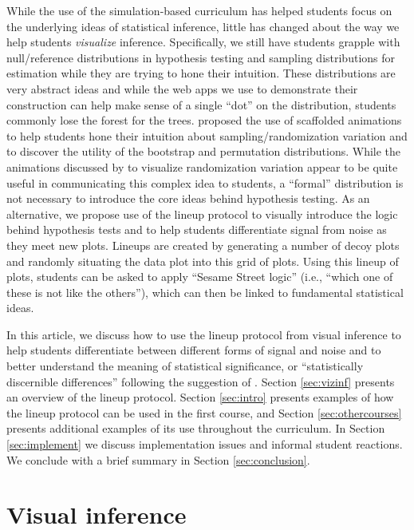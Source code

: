 \documentclass[12pt]{article}
\begin{document}
While the use of the simulation-based curriculum has helped students
focus on the underlying ideas of statistical inference, little has
changed about the way we help students \emph{visualize} inference.
Specifically, we still have students grapple with null/reference
distributions in hypothesis testing and sampling distributions for
estimation while they are trying to hone their intuition. These
distributions are very abstract ideas and while the web apps we use to
demonstrate their construction can help make sense of a single ``dot''
on the distribution, students commonly lose the forest for the trees.
\citet{wild2017} proposed the use of scaffolded animations to help
students hone their intuition about sampling/randomization variation and
to discover the utility of the bootstrap and permutation distributions.
While the animations discussed by \citet{wild2017} to visualize
randomization variation appear to be quite useful in communicating this
complex idea to students, a ``formal'' distribution is not necessary to
introduce the core ideas behind hypothesis testing. As an alternative,
we propose use of the lineup protocol \citep{Buja-2009bd} to visually
introduce the logic behind hypothesis tests and to help students
differentiate signal from noise as they meet new plots. Lineups are
created by generating a number of decoy plots and randomly situating the
data plot into this grid of plots. Using this lineup of plots, students
can be asked to apply ``Sesame Street logic'' (i.e., ``which one of
these is not like the others''), which can then be linked to fundamental
statistical ideas.

In this article, we discuss how to use the lineup protocol from visual
inference to help students differentiate between different forms of
signal and noise and to better understand the meaning of statistical
significance, or ``statistically discernible differences'' following the
suggestion of \citet{Witmer2019-qg}. Section \ref{sec:vizinf} presents
an overview of the lineup protocol. Section \ref{sec:intro} presents
examples of how the lineup protocol can be used in the first course, and
Section \ref{sec:othercourses} presents additional examples of its use
throughout the curriculum. In Section \ref{sec:implement} we discuss
implementation issues and informal student reactions. We conclude with a
brief summary in Section \ref{sec:conclusion}.

\hypertarget{visual-inference}{%
\section{Visual inference}\label{visual-inference}}
\end{document}

